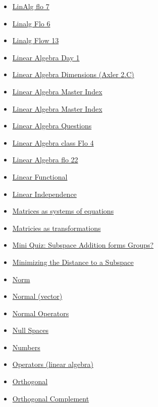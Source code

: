 \documentclass[11pt]{article}
\begin{document}
\begin{itemize}
\begin{itemize}
\item \href{math530/KBe20math530flo7.org}{LinAlg flo 7}
\item \href{math530/KBe20math530flo6.org}{Linalg Flo 6}
\item \href{math530/KBe20math530flo13.org}{Linalg Flow 13}
\item \href{math530/KBe2020math530flo1.org}{Linear Algebra Day 1}
\item \href{math530/KBeRefLinAlgDimension.org}{Linear Algebra Dimensions (Axler 2.C)}
\item \href{math530/KBxLinAlgMasterIndex.org}{Linear Algebra Master Index}
\item \href{math530/KBe2020math530index.org}{Linear Algebra Master Index}
\item \href{math530/KBe20math530floQuestions.org}{Linear Algebra Questions}
\item \href{math530/KBe20math530flo4.org}{Linear Algebra class Flo 4}
\item \href{math530/KBe20math530flo22.org}{Linear Algebra flo 22}
\item \href{math530/KBrefLinearFunctional.org}{Linear Functional}
\item \href{math530/KB20math530refLinearIndependence.org}{Linear Independence}
\item \href{math530/KBe2020math530floMatriciesSystemsEquations.org}{Matrices as systems of equations}
\item \href{math530/KBE2020math501floMatriciesAsTransformations.org}{Matricies as transformations}
\item \href{math530/KBe20math530retMiniQuizSubspaceAdditionGroup.org}{Mini Quiz: Subspace Addition forms Groups?}
\item \href{math530/KBrefMinimizingDistanceToSubspace.org}{Minimizing the Distance to a Subspace}
\item \href{math530/KBrefNorm.org}{Norm}
\item \href{math530/KBrefNormal.org}{Normal (vector)}
\item \href{math530/KBrefNormalOperators.org}{Normal Operators}
\item \href{math530/KBrefNullSpace.org}{Null Spaces}
\item \href{math530/KBe2020math530floNumbers.org}{Numbers}
\item \href{math530/KBrefOperators.org}{Operators (linear algebra)}
\item \href{math530/KBrefOrthogonal.org}{Orthogonal}
\item \href{math530/KBrefOrthogonalComplement.org}{Orthogonal Complement}

\end{itemize}
\end{itemize}
\end{document}
